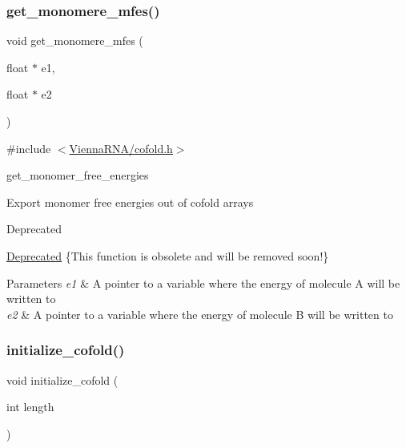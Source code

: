 \subsubsection{\texorpdfstring{get\+\_\+monomere\+\_\+mfes()}{get\_monomere\_mfes()}}
{\footnotesize\ttfamily void get\+\_\+monomere\+\_\+mfes (\begin{DoxyParamCaption}\item[{float $\ast$}]{e1,  }\item[{float $\ast$}]{e2 }\end{DoxyParamCaption})}



{\ttfamily \#include $<$\hyperlink{cofold_8h}{Vienna\+R\+N\+A/cofold.\+h}$>$}



get\+\_\+monomer\+\_\+free\+\_\+energies 

Export monomer free energies out of cofold arrays \begin{DoxyRefDesc}{Deprecated}
\item[\hyperlink{deprecated__deprecated000037}{Deprecated}]\{This function is obsolete and will be removed soon!\}\end{DoxyRefDesc}



\begin{DoxyParams}{Parameters}
{\em e1} & A pointer to a variable where the energy of molecule A will be written to \\
\hline
{\em e2} & A pointer to a variable where the energy of molecule B will be written to \\
\hline
\end{DoxyParams}
\mbox{\label{group__mfe__cofold_gafee0c32208aa2ac97338b6e3fbad7fa5}} 
\subsubsection{\texorpdfstring{initialize\+\_\+cofold()}{initialize\_cofold()}}
{\footnotesize\ttfamily void initialize\+\_\+cofold (\begin{DoxyParamCaption}\item[{int}]{length }\end{DoxyParamCaption})}



